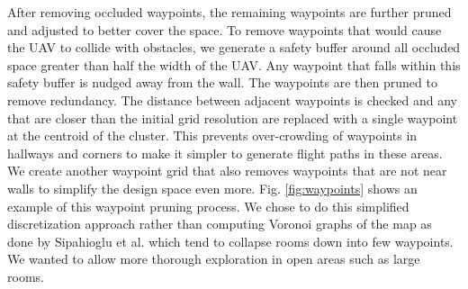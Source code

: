 \documentclass[letterpaper, 10 pt, conference]{ieeeconf}  %
\begin{document}
After removing occluded waypoints, the remaining waypoints are further pruned and adjusted to better cover the space. To remove waypoints that would cause the UAV to collide with obstacles, we generate a safety buffer around all occluded space greater than half the width of the UAV. Any waypoint that falls within this safety buffer is nudged away from the wall. The waypoints are then pruned to remove redundancy. The distance between adjacent waypoints is checked and any that are closer than the initial grid resolution are replaced with a single waypoint at the centroid of the cluster. This prevents over-crowding of waypoints in hallways and corners to make it simpler to generate flight paths in these areas. We create another waypoint grid that also removes waypoints that are not near walls to simplify the design space even more. Fig. \ref{fig:waypoints} shows an example of this waypoint pruning process. We chose to do this simplified discretization approach rather than computing Voronoi graphs of the map as done by Sipahioglu et al. \cite{Sipahioglu2010} which tend to collapse rooms down into few waypoints. We wanted to allow more thorough exploration in open areas such as large rooms.
\end{document}

